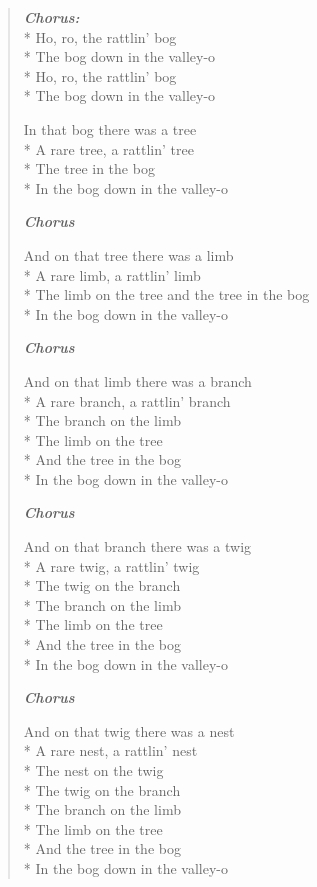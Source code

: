 \documentclass[9pt,twoside]{extarticle}
\newenvironment{xverse}{
	\begin{verse}
	\fontsize{8.5}{10.5}\selectfont
	}
	{
	\end{verse}
	\penalty 0
}
\newcommand{\chorusdef}{\textbf{\emph{Chorus:}}\\*}
\newcommand{\chorusmark}[1][1]{%
\vspace{-0.5\stanzaskip}%
\textbf{\emph{Chorus \ifthenelse{\equal{#1}{1}}{}{$\times$ #1}}}%
\vspace{-0.5\stanzaskip}%
}
\begin{document}
\begin{xverse}
\chorusdef
Ho, ro, the rattlin’ bog \\*
The bog down in the valley-o \\*
Ho, ro, the rattlin’ bog \\*
The bog down in the valley-o

In that bog there was a tree \\*
A rare tree, a rattlin’ tree \\*
The tree in the bog \\*
In the bog down in the valley-o

\chorusmark

And on that tree there was a limb \\*
A rare limb, a rattlin’ limb \\*
The limb on the tree and the tree in the bog \\*
In the bog down in the valley-o

\chorusmark

And on that limb there was a branch \\*
A rare branch, a rattlin’ branch \\*
The branch on the limb \\*
The limb on the tree \\*
And the tree in the bog \\*
In the bog down in the valley-o

\chorusmark

And on that branch there was a twig \\*
A rare twig, a rattlin’ twig \\*
The twig on the branch \\*
The branch on the limb \\*
The limb on the tree \\*
And the tree in the bog \\*
In the bog down in the valley-o

\chorusmark

And on that twig there was a nest \\*
A rare nest, a rattlin’ nest \\*
The nest on the twig \\*
The twig on the branch \\*
The branch on the limb \\*
The limb on the tree \\*
And the tree in the bog \\*
In the bog down in the valley-o


\end{xverse}
\end{document}
